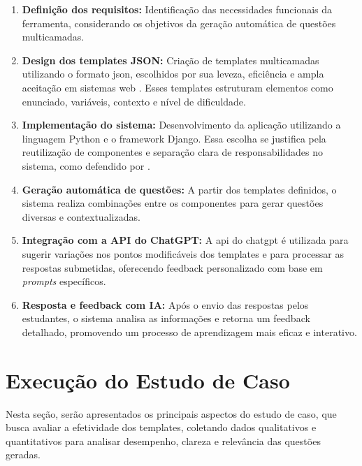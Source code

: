 \begin{enumerate}[label=\textbf{\arabic*)}]
    \item \textbf{Definição dos requisitos:} Identificação das necessidades funcionais da ferramenta, considerando os objetivos da geração automática de questões multicamadas.

    \item \textbf{Design dos templates JSON:} Criação de templates multicamadas utilizando o formato \gls{json}, escolhidos por sua leveza, eficiência e ampla aceitação em sistemas web \parencite{goyal2017, wang2011}. Esses templates estruturam elementos como enunciado, variáveis, contexto e nível de dificuldade.

    \item \textbf{Implementação do sistema:} Desenvolvimento da aplicação utilizando a linguagem Python e o framework Django. Essa escolha se justifica pela reutilização de componentes e separação clara de responsabilidades no sistema, como defendido por \parencite{rubio2017}.

    \item \textbf{Geração automática de questões:} A partir dos templates definidos, o sistema realiza combinações entre os componentes para gerar questões diversas e contextualizadas.

    \item \textbf{Integração com a API do ChatGPT:} A \gls{api} do \gls{chatgpt} é utilizada para sugerir variações nos pontos modificáveis dos templates e para processar as respostas submetidas, oferecendo feedback personalizado com base em \textit{prompts} específicos.

    \item \textbf{Resposta e feedback com IA:} Após o envio das respostas pelos estudantes, o sistema analisa as informações e retorna um feedback detalhado, promovendo um processo de aprendizagem mais eficaz e interativo.
\end{enumerate}


\section{Execução do Estudo de Caso}

Nesta seção, serão apresentados os principais aspectos do estudo de caso, que busca avaliar a efetividade dos templates, coletando dados qualitativos e quantitativos para analisar desempenho, clareza e relevância das questões geradas. 


